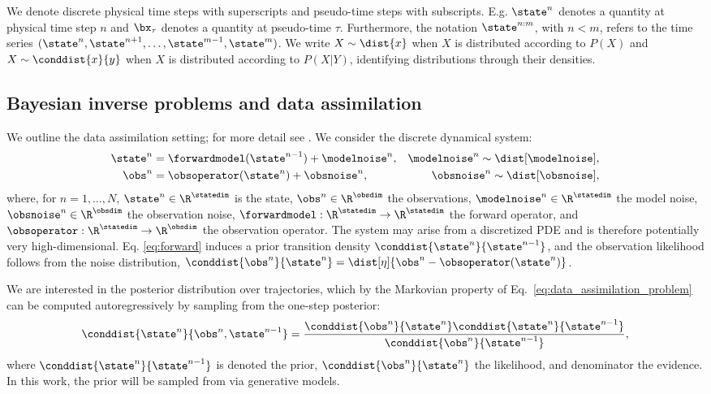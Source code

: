 We denote discrete physical time steps with superscripts and pseudo-time steps with subscripts. E.g. $\state^{n}$ denotes a quantity at physical time step $n$ and $\bx_{\tau}$ denotes a quantity at pseudo-time $\tau$. Furthermore, the notation $\state^{n:m}$, with $n < m$, refers to the time series $(\state^{n}, \state^{n+1}, \ldots, \state^{m-1}, \state^{m})$. We write $X\sim \dist{x}$ when $X$ is distributed according to $P(X)$ and $X\sim \conddist{x}{y}$ when $X$ is distributed according to $P(X|Y)$, identifying distributions through their densities.

\subsection{Bayesian inverse problems and data assimilation}
We outline the data assimilation setting; for more detail see \cite{carrassi_data_2018, evensen_data_2022}. We consider the discrete dynamical system:
\begin{subequations} \label{eq:data_assimilation_problem}
\begin{align}
    \state^{n} &= \forwardmodel(\state^{n-1}) + \modelnoise^{n},  &\modelnoise^{n}\sim \dist[\modelnoise], \label{eq:forward}\\
    \obs^{n} &= \obsoperator(\state^{n}) + \obsnoise^{n},  &\obsnoise^{n}\sim \dist[\obsnoise], \label{eq:observation}
\end{align}
\end{subequations}
where, for $n=1,\ldots,N$, $\state^{n}\in\R^{\statedim}$ is the state, $\obs^n\in\R^{\obsdim}$ the observations, $\modelnoise^n\in\R^{\statedim}$ the model noise, $\obsnoise^n\in\R^{\obsdim}$ the observation noise, $\forwardmodel:\R^{\statedim}\rightarrow\R^{\statedim}$ the forward operator, and $\obsoperator:\R^{\statedim}\rightarrow\R^{\obsdim}$ the observation operator. The system may arise from a discretized PDE and is therefore potentially very high-dimensional. Eq. \eqref{eq:forward} induces a prior transition density $\conddist{\state^{n}}{\state^{n-1}}$, and the observation likelihood follows from the noise distribution, $\conddist{\obs^n}{\state^{n}} = \dist[\eta]{\obs^n-\obsoperator(\state^{n})}$.

We are interested in the posterior distribution over trajectories, which by the Markovian property of Eq.~\eqref{eq:data_assimilation_problem} can be computed autoregressively by sampling from the one-step posterior:
\begin{align} \label{eq:posterior_distribution}
    \conddist{\state^{n}}{\obs^n, \state^{n-1}} = \frac{\conddist{\obs^{n}}{\state^{n}}\conddist{\state^{n}}{\state^{n-1}}}{\conddist{\obs^{n}}{\state^{n-1}}},
\end{align}
where $\conddist{\state^{n}}{\state^{n-1}}$ is denoted the prior, $\conddist{\obs^{n}}{\state^{n}}$ the likelihood, and denominator the evidence. In this work, the prior will be sampled from via generative models. 

